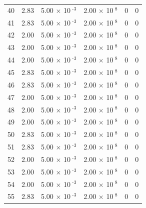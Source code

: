 \documentclass[a4paper,11pt]{article}
\begin{document}
\begin{center}
\begin{longtable}{|R{1.5cm}|R{2.4cm}|R{2.4cm}|R{2.4cm}|R{2.4cm}|R{2.4cm}|}
   40 &   2.83  &         5.00 $\times$ 10$^{\text{          -3}}$  &         2.00 $\times$ 10$^{\text{           8}}$  & 0  & 0 \\
   41 &   2.83  &         5.00 $\times$ 10$^{\text{          -3}}$  &         2.00 $\times$ 10$^{\text{           8}}$  & 0  & 0 \\
   42 &   2.00  &         5.00 $\times$ 10$^{\text{          -3}}$  &         2.00 $\times$ 10$^{\text{           8}}$  & 0  & 0 \\
   43 &   2.00  &         5.00 $\times$ 10$^{\text{          -3}}$  &         2.00 $\times$ 10$^{\text{           8}}$  & 0  & 0 \\
   44 &   2.00  &         5.00 $\times$ 10$^{\text{          -3}}$  &         2.00 $\times$ 10$^{\text{           8}}$  & 0  & 0 \\
   45 &   2.83  &         5.00 $\times$ 10$^{\text{          -3}}$  &         2.00 $\times$ 10$^{\text{           8}}$  & 0  & 0 \\
   46 &   2.83  &         5.00 $\times$ 10$^{\text{          -3}}$  &         2.00 $\times$ 10$^{\text{           8}}$  & 0  & 0 \\
   47 &   2.00  &         5.00 $\times$ 10$^{\text{          -3}}$  &         2.00 $\times$ 10$^{\text{           8}}$  & 0  & 0 \\
   48 &   2.00  &         5.00 $\times$ 10$^{\text{          -3}}$  &         2.00 $\times$ 10$^{\text{           8}}$  & 0  & 0 \\
   49 &   2.00  &         5.00 $\times$ 10$^{\text{          -3}}$  &         2.00 $\times$ 10$^{\text{           8}}$  & 0  & 0 \\
   50 &   2.83  &         5.00 $\times$ 10$^{\text{          -3}}$  &         2.00 $\times$ 10$^{\text{           8}}$  & 0  & 0 \\
   51 &   2.83  &         5.00 $\times$ 10$^{\text{          -3}}$  &         2.00 $\times$ 10$^{\text{           8}}$  & 0  & 0 \\
   52 &   2.00  &         5.00 $\times$ 10$^{\text{          -3}}$  &         2.00 $\times$ 10$^{\text{           8}}$  & 0  & 0 \\
   53 &   2.00  &         5.00 $\times$ 10$^{\text{          -3}}$  &         2.00 $\times$ 10$^{\text{           8}}$  & 0  & 0 \\
   54 &   2.00  &         5.00 $\times$ 10$^{\text{          -3}}$  &         2.00 $\times$ 10$^{\text{           8}}$  & 0  & 0 \\
   55 &   2.83  &         5.00 $\times$ 10$^{\text{          -3}}$  &         2.00 $\times$ 10$^{\text{           8}}$  & 0  & 0 \\

\end{longtable}
\end{center}
\end{document}

